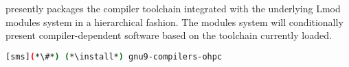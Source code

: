 \OHPC{} presently packages the \GNU{} compiler toolchain integrated with the 
underlying Lmod modules system in a hierarchical fashion. The modules
system will conditionally present compiler-dependent software based on the
toolchain currently loaded. 

\begin{lstlisting}[language=bash]
[sms](*\#*) (*\install*) gnu9-compilers-ohpc
\end{lstlisting}


